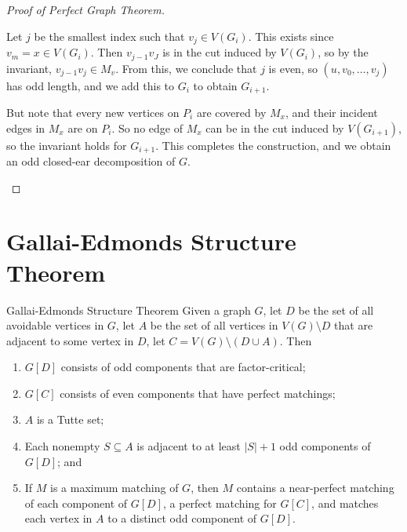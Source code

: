 \documentclass[co342]{subfiles}
\begin{document}
\begin{proof}[Proof of Perfect Graph Theorem]
\begin{itemize}
\begin{itemize}
                        Let $j$ be the smallest index such that $v_j\in V\left( G_i \right)$. This exists since $v_m=x\in V\left( G_i \right)$. Then $v_{j-1}v_J$ is in the cut induced by $V\left( G_i \right)$, so by the invariant, $v_{j-1}v_j\in M_v$. From this, we conclude that $j$ is even, so $\left( u,v_0,\ldots,v_j \right)$ has odd length, and we add this to $G_i$ to obtain $G_{i+1}$.

                        But note that every new vertices on $P_i$ are covered by $M_x$, and their incident edges in $M_x$ are on $P_i$. So no edge of $M_x$ can be in the cut induced by $V\left( G_{i+1} \right)$, so the invariant holds for $G_{i+1}$. This completes the construction, and we obtain an odd closed-ear decomposition of $G$. \qqedsym
                \end{itemize} 
        \end{itemize} 
    \end{proof}

    \section{Gallai-Edmonds Structure Theorem}
    
    \begin{theorem}{Gallai-Edmonds Structure Theorem}
        Given a graph $G$, let $D$ be the set of all avoidable vertices in $G$, let $A$ be the set of all vertices in $V\left( G \right)\setminus D$ that are adjacent to some vertex in $D$, let $C=V\left( G \right)\setminus \left( D\cup A \right)$. Then
        \begin{enumerate}
            \item $G\left[ D \right]$ consists of odd components that are factor-critical;
            \item $G\left[ C \right]$ consists of even components that have perfect matchings;
            \item $A$ is a Tutte set;
            \item Each nonempty $S\subseteq A$ is adjacent to at least $\left| S \right|+1$ odd components of $G\left[ D \right]$; and
            \item If $M$ is a maximum matching of $G$, then $M$ contains a near-perfect matching of each component of $G\left[ D \right]$, a perfect matching for $G\left[ C \right]$, and matches each vertex in $A$ to a distinct odd component of $G\left[ D \right]$.
        \end{enumerate}
    \end{theorem}
    
\end{document}
